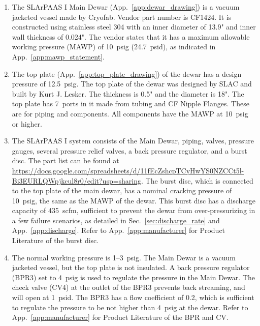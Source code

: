 \begin{enumerate}
    \item The SLArPAAS I Main Dewar (App.~\ref{app:dewar_drawing}) is a vacuum jacketed 
    vessel made by Cryofab. Vendor part number is CF1424.
    It is constructed using stainless steel 304 with an inner diameter of 13.9" 
    and inner wall thickness of 0.024". 
    The vendor states that it has a maximum allowable working pressure (MAWP) 
    of 10~psig (24.7~psid), as indicated in App.~\ref{app:mawp_statement}.
    \item The top plate (App.~\ref{app:top_plate_drawing}) of the dewar has a design 
    pressure of 12.5~psig. 
    The top plate of the dewar was designed by SLAC and built by Kurt J. Lesker.
    The thickness is 0.5" and the diameter is 18". 
    The top plate has 7~ports in it made from tubing and CF Nipple Flanges. 
    These are for piping and components. All components have the MAWP at 10~psig or higher.
    \item The SLArPAAS I system consists of the Main Dewar, piping, valves, pressure gauges, 
    several pressure relief valves, a back pressure regulator, and a burst disc. 
    The part list can be found at 
    \url{https://docs.google.com/spreadsheets/d/11fEcZshcpTCyHwYS0NZCCt5l-Bi3EURLQWpjkcul8r0/edit?usp=sharing}. 
    The burst disc, which is connected to the top plate of the main dewar, 
    has a nominal cracking pressure of 10~psig, the same as the MAWP of the dewar. 
    This burst disc has a discharge capacity of 435~scfm, sufficient to prevent the dewar 
    from over-pressurizing in a few failure scenarios, as detailed in
    Sec.~\ref{sec:discharge_rate} and App.~\ref{app:discharge}. 
    Refer to App.~\ref{app:manufacturer} for Product Literature of the burst disc.
    \item The normal working pressure is 1--3~psig. 
    The Main Dewar is a vacuum jacketed vessel, but the top plate is not insulated. 
    A back pressure regulator (BPR3) set to 4~psig is used to regulate the pressure in the Main Dewar.
    The check valve (CV4) at the outlet of the BPR3 prevents back streaming, and will open
    at 1~psid. 
    The BPR3 has a flow coefficient of 0.2, which is sufficient to regulate the pressure to 
    be not higher than 4~psig at the dewar. 
    Refer to App.~\ref{app:manufacturer} for Product Literature of the BPR and CV.
\end{enumerate}
